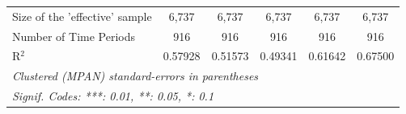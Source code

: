 \begin{table}[htbp]
\begin{tabular}{lccccc}
      Size of the 'effective' sample & 6,737          & 6,737          & 6,737           & 6,737           & 6,737\\  
      Number of Time Periods         & 916            & 916            & 916             & 916             & 916\\  
      R$^2$                          & 0.57928        & 0.51573        & 0.49341         & 0.61642         & 0.67500\\  
      \midrule \midrule
      \multicolumn{6}{l}{\emph{Clustered (MPAN) standard-errors in parentheses}}\\
      \multicolumn{6}{l}{\emph{Signif. Codes: ***: 0.01, **: 0.05, *: 0.1}}\\
   \end{tabular}
\end{table}


